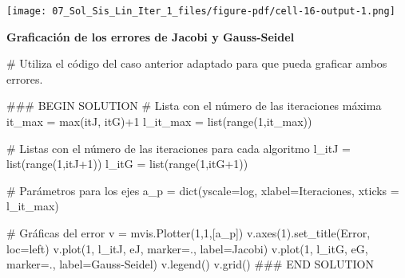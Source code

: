 \documentclass[
  letterpaper,
  DIV=11,
  numbers=noendperiod]{scrreprt}
\newenvironment{Shaded}{\begin{snugshade}}{\end{snugshade}}
\newcommand{\BuiltInTok}[1]{\textcolor[rgb]{0.00,0.23,0.31}{#1}}
\newcommand{\CommentTok}[1]{\textcolor[rgb]{0.37,0.37,0.37}{#1}}
\newcommand{\DecValTok}[1]{\textcolor[rgb]{0.68,0.00,0.00}{#1}}
\newcommand{\NormalTok}[1]{\textcolor[rgb]{0.00,0.23,0.31}{#1}}
\newcommand{\OperatorTok}[1]{\textcolor[rgb]{0.37,0.37,0.37}{#1}}
\newcommand{\RegionMarkerTok}[1]{\textcolor[rgb]{0.00,0.23,0.31}{#1}}
\newcommand{\StringTok}[1]{\textcolor[rgb]{0.13,0.47,0.30}{#1}}
\begin{document}
\texttt{[image: 07\_Sol\_Sis\_Lin\_Iter\_1\_files/figure-pdf/cell-16-output-1.png]}

\textbf{Graficación de los errores de Jacobi y Gauss-Seidel}

\begin{Shaded}
\begin{Highlighting}[]
\CommentTok{\# Utiliza el código del caso anterior adaptado para que pueda graficar ambos errores.}

\CommentTok{\#\#\# }\RegionMarkerTok{BEGIN}\CommentTok{ SOLUTION}
\CommentTok{\# Lista con el número de las iteraciones máxima}
\NormalTok{it\_max }\OperatorTok{=} \BuiltInTok{max}\NormalTok{(itJ, itG)}\OperatorTok{+}\DecValTok{1}
\NormalTok{l\_it\_max }\OperatorTok{=} \BuiltInTok{list}\NormalTok{(}\BuiltInTok{range}\NormalTok{(}\DecValTok{1}\NormalTok{,it\_max)) }

\CommentTok{\# Listas con el número de las iteraciones para cada algoritmo}
\NormalTok{l\_itJ }\OperatorTok{=} \BuiltInTok{list}\NormalTok{(}\BuiltInTok{range}\NormalTok{(}\DecValTok{1}\NormalTok{,itJ}\OperatorTok{+}\DecValTok{1}\NormalTok{)) }
\NormalTok{l\_itG }\OperatorTok{=} \BuiltInTok{list}\NormalTok{(}\BuiltInTok{range}\NormalTok{(}\DecValTok{1}\NormalTok{,itG}\OperatorTok{+}\DecValTok{1}\NormalTok{)) }

\CommentTok{\# Parámetros para los ejes}
\NormalTok{a\_p }\OperatorTok{=} \BuiltInTok{dict}\NormalTok{(yscale}\OperatorTok{=}\StringTok{\textquotesingle{}log\textquotesingle{}}\NormalTok{, xlabel}\OperatorTok{=}\StringTok{\textquotesingle{}Iteraciones\textquotesingle{}}\NormalTok{, xticks }\OperatorTok{=}\NormalTok{ l\_it\_max)}

\CommentTok{\# Gráficas del error}
\NormalTok{v }\OperatorTok{=}\NormalTok{ mvis.Plotter(}\DecValTok{1}\NormalTok{,}\DecValTok{1}\NormalTok{,[a\_p]) }
\NormalTok{v.axes(}\DecValTok{1}\NormalTok{).set\_title(}\StringTok{\textquotesingle{}Error\textquotesingle{}}\NormalTok{, loc}\OperatorTok{=}\StringTok{\textquotesingle{}left\textquotesingle{}}\NormalTok{)}
\NormalTok{v.plot(}\DecValTok{1}\NormalTok{, l\_itJ, eJ, marker}\OperatorTok{=}\StringTok{\textquotesingle{}.\textquotesingle{}}\NormalTok{, label}\OperatorTok{=}\StringTok{\textquotesingle{}Jacobi\textquotesingle{}}\NormalTok{)}
\NormalTok{v.plot(}\DecValTok{1}\NormalTok{, l\_itG, eG, marker}\OperatorTok{=}\StringTok{\textquotesingle{}.\textquotesingle{}}\NormalTok{, label}\OperatorTok{=}\StringTok{\textquotesingle{}Gauss{-}Seidel\textquotesingle{}}\NormalTok{)}
\NormalTok{v.legend()}
\NormalTok{v.grid()}
\CommentTok{\#\#\# }\RegionMarkerTok{END}\CommentTok{ SOLUTION}
\end{Highlighting}
\end{Shaded}
\end{document}
